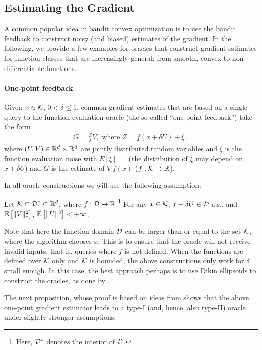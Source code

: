 \subsection{Estimating the Gradient}

A common popular idea in bandit convex optimization is to use the bandit feedback to construct noisy (and biased) estimates of the gradient.
In the following, we provide a few examples for oracles that construct gradient estimates for function classes that are increasingly general: from smooth, convex to non-differentiable functions.

\paragraph{One-point feedback}
Given $x\in \mathcal{K}$, $0<\delta\le 1$, common gradient estimates that are
based on a single query to the function evaluation oracle (the so-called
``one-point feedback'') take the form
\begin{align}
  \label{eq:one-point}
G = \frac{Z}{\delta}V, \textrm{ where } Z = f(x+\delta U) + \xi\,,
\end{align}
where $(U,V)\in \mathbb{R}^d\times \mathbb{R}^d$ are jointly distributed random variables
and $\xi$ is the function evaluation noise with $E[\xi]=$ (the distribution of $\xi$ may depend on $x+\delta U$) and $G$ is the estimate of $\nabla f(x)$ ($f:\mathcal{K}\to \mathbb{R}$).

In all oracle constructions we will use the following assumption:
\begin{ass}
  \label{ass:gradbasic}
  Let $\mathcal{K} \subset \mathcal{D}^\circ \subset \mathbb{R}^d$, where $f:\mathcal{D} \to \mathbb{R}$.\footnote{Here, $\mathcal{D}^\circ$ denotes the interior of $\mathcal{D}$.}
  For any $x\in \mathcal{K}$, $x+\delta U \in \mathcal{D}$ a.s.,
  and $\mathbb{E}\left[\|V\|_*^2\right]$, $\mathbb{E}\left[ \|U\|^3 \right]<+\infty$.
\end{ass}
Note that here the function domain $\mathcal{D}$ can be larger than or equal to the set $\mathcal{K}$, where the algorithm chooses $x$. This is to ensure that the oracle will not receive invalid inputs, that is, queries where $f$ is not defined.
When the functions are defined over $\mathcal{K}$ only and $\mathcal{K}$ is bounded, the above constructions only work for $\delta$ small enough.
In this case, the best approach perhaps is to use Dikin ellipsoids to construct the oracles, as done by \citet{HaLe14:SOC}.

The next proposition, whose proof is based on ideas from \citet{spall1992multivariate} shows that the above one-point gradient estimator leads to a type-I (and, hence, also type-II) oracle under slightly stronger assumptions.

